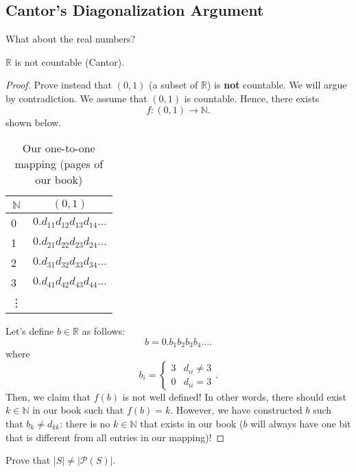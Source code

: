 \subsection{Cantor's Diagonalization Argument}
What about the real numbers?
\begin{theorem}
	\( \mathbb{R} \) is not countable (Cantor).
\end{theorem}
\begin{proof}
	Prove instead that \( (0,1) \) (a subset of \( \mathbb{R} \)) is \textbf{not} countable. We will argue by contradiction. We assume that \( (0,1) \) is countable. Hence, there exists \[
		f \colon (0,1) \to \mathbb{N} 
	.\] shown below.

	\begin{table}[H]
		\caption{Our one-to-one mapping (pages of our book)}\label{tab:}
		\begin{center}
			\begin{tabular}[c]{|l|l|}
				\hline
				\multicolumn{1}{|c|}{\textbf{\( \mathbb{N} \)}} & 
				\multicolumn{1}{c|}{\textbf{\( (0,1) \)}} \\
				\hline
				0 & \( 0.d_{11} d_{12} d_{13} d_{14} \ldots  \) \\
				1 & \( 0.d_{21} d_{22} d_{23} d_{24} \ldots  \) \\
				2 & \( 0.d_{31} d_{32} d_{33} d_{34} \ldots  \) \\
				3 & \( 0.d_{41} d_{42} d_{43} d_{44} \ldots  \) \\
				\vdots & \\
				\hline
			\end{tabular}
		\end{center}
	\end{table}

	Let's define \( b \in \mathbb{R} \) as follows: \[
		b = 0.b_1b_2b_3b_4 \ldots
	.\] where \[
		b_i = \begin{cases}
			3 & d_{ii} \neq 3 \\
			0 & d_{ii} = 3
		\end{cases}
	.\] Then, we claim that \( f(b) \) is not well defined! In other words, there should exist \( k \in \mathbb{N}\) in our book such that \( f(b) = k \). However, we have constructed \( b \) such that \( b_k \neq d_{kk} \): there is no \( k \in \mathbb{N} \) that exists in our book \contra (\( b \) will always have one bit that is different from all entries in our mapping)!
\end{proof}

Prove that \( |S| \neq |\mathcal{P}(S)| \).

